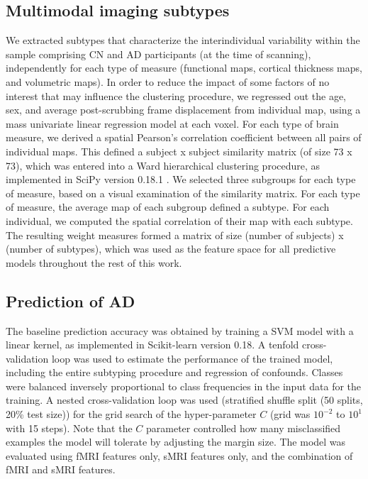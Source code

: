 \documentclass[authoryear]{elsarticle}
\begin{document}
\subsection*{Multimodal imaging subtypes}
We extracted subtypes that characterize the interindividual variability within the sample comprising CN and AD participants (at the time of scanning), independently for each type of measure (functional maps, cortical thickness maps, and volumetric maps). In order to reduce the impact of some factors of no interest that may influence the clustering procedure, we regressed out the age, sex, and average post-scrubbing frame displacement from individual map, using a mass univariate linear regression model at each voxel. For each type of brain measure, we derived a spatial Pearson's correlation coefficient between all pairs of individual maps. This defined a subject x subject similarity matrix (of size 73 x 73), which was entered into a Ward hierarchical clustering procedure, as implemented in SciPy version 0.18.1 \citep{scipy,Walt2011numpy}. We selected three subgroups for each type of measure, based on a visual examination of the similarity matrix. For each type of measure, the average map of each subgroup defined a subtype. For each individual, we computed the spatial correlation of their map with each subtype. The resulting weight measures formed a matrix of size (number of subjects) x (number of subtypes), which was used as the feature space for all predictive models throughout the rest of this work. 
\subsection*{Prediction of AD}
The baseline prediction accuracy was obtained by training a SVM model with a linear kernel, as implemented in Scikit-learn \cite{scikit-learn} version 0.18. A tenfold cross-validation loop was used to estimate the performance of the trained model, including the entire subtyping procedure and regression of confounds. Classes were balanced inversely proportional to class frequencies in the input data for the training. A nested cross-validation loop was used (stratified shuffle split (50 splits, 20\% test size)) for the grid search of the hyper-parameter $C$ (grid was $10^{-2}$ to $10^{1}$ with 15 steps). Note that the $C$ parameter controlled how many misclassified examples the model will tolerate by adjusting the margin size. The model was evaluated using fMRI features only, sMRI features only, and the combination of fMRI and sMRI features. 
\end{document}

